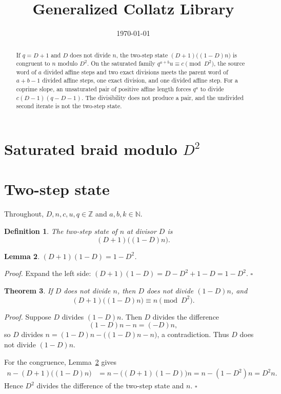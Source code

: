 \documentclass[11pt,letterpaper]{article}
\title{Generalized Collatz Library}
\author{}
\date{\today}
\newcommand{\N}{\mathbb{N}}
\newcommand{\Z}{\mathbb{Z}}
\newtheorem{theorem}{Theorem}
\newtheorem{lemma}[theorem]{Lemma}
\newtheorem{definition}[theorem]{Definition}
\newenvironment{proof}{\noindent\textit{Proof.}}{\hfill\(\square\)}
\begin{document}
\maketitle
\section*{Saturated braid modulo \(D^2\)}

\begin{abstract}
If \(q=D+1\) and \(D\) does not divide \(n\), the two-step state \((D+1)\bigl((1-D)n\bigr)\) is congruent to \(n\) modulo \(D^2\). On the saturated family \(q^{a+b}u\equiv c\pmod{D^2}\), the source word of \(a\) divided affine steps and two exact divisions meets the parent word of \(a+b-1\) divided affine steps, one exact division, and one divided affine step. For a coprime slope, an unsaturated pair of positive affine length forces \(q^a\) to divide \(c(D-1)(q-D-1)\). The divisibility does not produce a pair, and the undivided second iterate is not the two-step state.
\end{abstract}

\section{Two-step state}

Throughout, \(D,n,c,u,q\in\Z\) and \(a,b,k\in\N\).

\begin{definition}
The \emph{two-step state} of \(n\) at divisor \(D\) is
\[
(D+1)\bigl((1-D)n\bigr).
\]
\end{definition}

\begin{lemma}
\label{lem:inverse-product}
\((D+1)(1-D)=1-D^2\).
\end{lemma}

\begin{proof}
Expand the left side: \((D+1)(1-D)=D-D^2+1-D=1-D^2\).
\end{proof}

\begin{theorem}
\label{thm:two-step}
If \(D\) does not divide \(n\), then \(D\) does not divide \((1-D)n\), and
\[
(D+1)\bigl((1-D)n\bigr)\equiv n\pmod{D^2}.
\]
\end{theorem}

\begin{proof}
Suppose \(D\) divides \((1-D)n\). Then \(D\) divides the difference
\[
(1-D)n-n=(-D)n,
\]
so \(D\) divides \(n=(1-D)n-\bigl((1-D)n-n\bigr)\), a contradiction. Thus \(D\) does not divide \((1-D)n\).

For the congruence, Lemma~\ref{lem:inverse-product} gives
\begin{align*}
n-(D+1)\bigl((1-D)n\bigr)
&=n-\bigl((D+1)(1-D)\bigr)n
=n-(1-D^2)n
=D^2 n.
\end{align*}
Hence \(D^2\) divides the difference of the two-step state and \(n\).
\end{proof}
\end{document}
